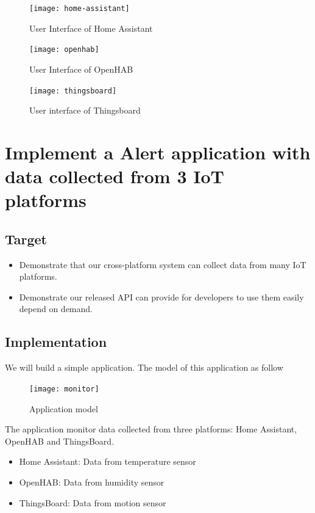 \documentclass[runningheads,a4paper]{llncs}
\begin{document}
\begin{figure}[H]
\centering
\texttt{[image: home-assistant]} 
\caption{User Interface of Home Assistant}
\end{figure} 



\begin{figure}[H]
\centering
\texttt{[image: openhab]} 
\caption{User Interface of OpenHAB}
\end{figure} 


\begin{figure}[H]
\centering
\texttt{[image: thingsboard]} 
\caption{User interface of Thingsboard}
\end{figure} 


\section{Implement a Alert application with data collected from 3 IoT platforms}
\subsection{Target}
\begin{itemize}
\item Demonstrate that our cross-platform system can collect data from many IoT platforms.
\item Demonstrate our released API can provide for developers to use them easily depend on demand.
\end{itemize}


\subsection{Implementation}
We will build a simple application. The model of this application as follow

\begin{figure}[H]
\centering
\texttt{[image: monitor]} 
\caption{Application model}
\end{figure} 

The application monitor data collected from three platforms: Home Assistant, OpenHAB and ThingsBoard.

\begin{itemize}
\item Home Assistant: Data from temperature sensor
\item OpenHAB: Data from humidity sensor
\item ThingsBoard: Data from motion sensor
\end{itemize}
\end{document}
